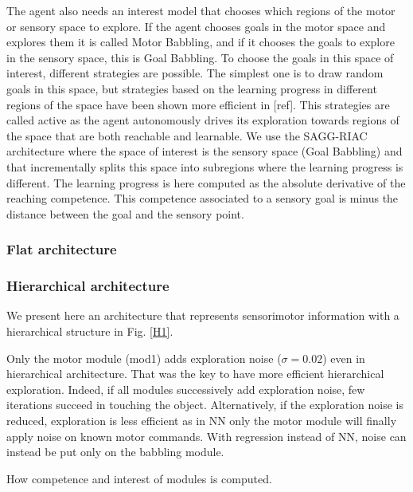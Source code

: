 \documentclass[10pt,letterpaper]{article}
\begin{document}
			The agent also needs an interest model that chooses which regions of the motor or sensory space to explore.
			If the agent chooses goals in the motor space and explores them it is called Motor Babbling, and if it chooses the goals to explore in the sensory space, this is Goal Babbling.
			To choose the goals in this space of interest, different strategies are possible. 
			The simplest one is to draw random goals in this space, but strategies based on the learning progress in different regions of the space have been shown more efficient in [ref].
			This strategies are called active as the agent autonomously drives its exploration towards regions of the space that are both reachable and learnable. 
			We use the SAGG-RIAC architecture \cite{baranes_active_2013} where the space of interest is the sensory space (Goal Babbling) and that incrementally splits this space into subregions where the learning progress 
			is different. 
			The learning progress is here computed as the absolute derivative of the reaching competence. 
			This competence associated to a sensory goal is minus the distance between the goal and the sensory point.
			
				
		
		\subsubsection{Flat architecture}
			
				
		
		\subsubsection{Hierarchical architecture}
			
			We present here an architecture that represents sensorimotor information with a hierarchical structure in Fig. \ref{H1}.
			
			Only the motor module (mod1) adds exploration noise ($\sigma=0.02$) even in hierarchical architecture. 
			That was the key to have more efficient hierarchical exploration. 
			Indeed, if all modules successively add exploration noise, few iterations succeed in touching the object. 
			Alternatively, if the exploration noise is reduced, exploration is less efficient as in NN only the motor module will finally apply noise on known motor commands. 
			With regression instead of NN, noise can instead be put only on the babbling module.
			
			How competence and interest of modules is computed.
			
\end{document}
